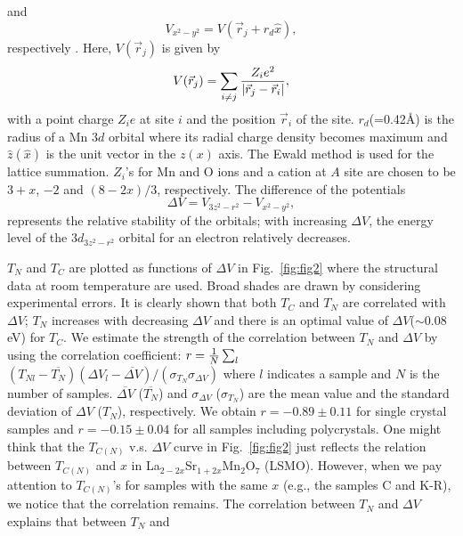 and
\begin{equation}
V_{x^2-y^2}=V(\vec{r}_j+r_d \hat{x}) ,
\end{equation}
respectively \cite{ishihara}.
Here, $V(\vec{r}_j)$ is given by
\begin{equation}
V(\vec{r}_j)=\sum_{i \ne j} {Z_ie^2 \over |\vec{r}_j -\vec{r}_i| },
\label{eq:sum}
\end{equation}
with a point charge $Z_ie$ at site $i$ and the position $\vec{r}_i$ of the site.
$r_d$(=0.42\AA) is the radius of a Mn $3d$ orbital
where its radial charge density becomes maximum \cite{slater}
and $\hat{z} (\hat{x})$ is the unit vector in the $z(x)$ axis.
The Ewald method is used for the lattice summation.
$Z_i$'s for Mn and O ions and a cation at $A$ site are chosen to be $3+x$, $-2$ and $(8-2x)/3$, respectively.
The difference of the potentials
\begin{equation}
\Delta V= V_{3z^2-r^2}-V_{x^2-y^2} ,
\end{equation}
represents the relative stability of the orbitals;
with increasing $\Delta V$,
the energy level of the $3d_{3z^2-r^2}$ orbital for an electron relatively decreases.
\par
$T_N$ and $T_C$
are plotted as functions of $\Delta V$ in Fig.~\ref{fig:fig2} where
the structural data at room temperature are used.
Broad shades are drawn by considering experimental errors.
It is clearly shown that both $T_C$ and $T_N$ are correlated with $\Delta V$;
$T_N$ increases with decreasing $\Delta V$ and there is an optimal value of
$\Delta V$($\sim 0.08$ eV) for $T_C$.
We estimate the strength of the correlation between $T_N$ and $\Delta V$
by using the correlation coefficient:
$r={1\over N} \sum_l$
$(T_{Nl}-\overline{T_N})(\Delta V_l-\overline{\Delta V}) /
(\sigma_{T_N}\sigma_{\Delta V} )
$
where $l$ indicates a sample and $N$ is the number of samples.
$\overline{\Delta V}$ ($\overline{T_N}$) and $\sigma_{\Delta V}$ ($\sigma_{T_N}$)
are the mean value and the standard deviation of $\Delta V$ ($T_N$), respectively.
We obtain $r=-0.89 \pm 0.11$ for single crystal samples
and $r=-0.15 \pm 0.04$ for all samples including polycrystals.
One might think that the $T_{C(N)}$ v.s. $\Delta V$ curve in Fig.~\ref{fig:fig2}
just reflects the relation between $T_{C(N)}$ and $x$ in
La$_{2-2x}$Sr$_{1+2x}$Mn$_2$O$_7$ (LSMO)\cite{kubota,medarde}.
However, when we pay attention to $T_{C(N)}$'s for samples with the same $x$
(e.g., the samples C and K-R), we notice that the correlation remains.
The correlation between $T_N$ and $\Delta V$ explains that between $T_N$ and
